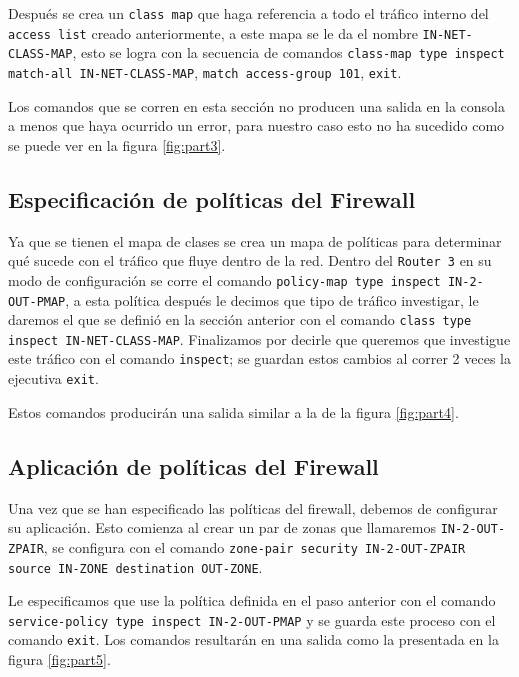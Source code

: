 \documentclass[11pt]{article}
\begin{document}
            Después se crea un \texttt{class map} que haga referencia a todo el tráfico interno del \texttt{access list} creado anteriormente, a este mapa se le da el nombre \texttt{IN-NET-CLASS-MAP}, esto se logra con la secuencia de comandos \texttt{class-map type inspect match-all IN-NET-CLASS-MAP}, \texttt{match access-group 101}, \texttt{exit}.

            Los comandos que se corren en esta sección no producen una salida en la consola a menos que haya ocurrido un error, para nuestro caso esto no ha sucedido como se puede ver en la figura \ref{fig:part3}.

        \subsection{Especificación de políticas del Firewall}

            Ya que se tienen el mapa de clases se crea un mapa de políticas para determinar qué sucede con el tráfico que fluye dentro de la red. Dentro del \texttt{Router 3} en su modo de configuración se corre el comando \texttt{policy-map type inspect IN-2-OUT-PMAP}, a esta política después le decimos que tipo de tráfico investigar, le daremos el que se definió en la sección anterior con el comando \texttt{class type inspect IN-NET-CLASS-MAP}. Finalizamos por decirle que queremos que investigue este tráfico con el comando \texttt{inspect}; se guardan estos cambios al correr 2 veces la ejecutiva \texttt{exit}.

            Estos comandos producirán una salida similar a la de la figura \ref{fig:part4}.

        \subsection{Aplicación de políticas del Firewall}

            Una vez que se han especificado las políticas del firewall, debemos de configurar su aplicación. Esto comienza al crear un par de zonas que llamaremos \texttt{IN-2-OUT-ZPAIR}, se configura con el comando \texttt{zone-pair security IN-2-OUT-ZPAIR source IN-ZONE destination OUT-ZONE}.

            Le especificamos que use la política definida en el paso anterior con el comando \texttt{service-policy type inspect IN-2-OUT-PMAP} y se guarda este proceso con el comando \texttt{exit}. Los comandos resultarán en una salida como la presentada en la figura \ref{fig:part5}.
\end{document}
